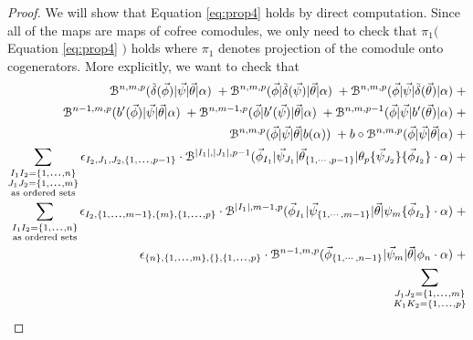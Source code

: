 \begin{proof}
We will show that Equation \ref{eq:prop4} 
holds by direct computation. Since all of 
the maps are maps of cofree comodules, we 
only need to check that $\pi_1($
Equation \ref{eq:prop4} $)$ holds where 
$\pi_1$ denotes projection of the comodule 
onto cogenerators. More explicitly, we 
want to check that
\begin{equation} \label{eq:prop4_expand}
\begin{aligned}
\mathcal{B}^{n,m,p} ( \tilde{\delta}(\vec{\phi}) | \vec{\psi} | \vec{\theta} | \alpha ) \; + 
\mathcal{B}^{n,m,p} ( \vec{\phi} | \tilde{\delta}(\vec{\psi}) | \vec{\theta} | \alpha ) \; + 
\mathcal{B}^{n,m,p} ( \vec{\phi} | \vec{\psi} | \tilde{\delta}(\vec{\theta}) | \alpha ) \; + \\
\mathcal{B}^{n-1,m,p} ( b^\prime(\vec{\phi}) | \vec{\psi} | \vec{\theta} | \alpha ) \; + 
\mathcal{B}^{n,m-1,p} ( \vec{\phi} | b^\prime(\vec{\psi}) | \vec{\theta} | \alpha ) \; + 
\mathcal{B}^{n,m,p-1} ( \vec{\phi} | \vec{\psi} | b^\prime(\vec{\theta}) | \alpha ) \; + \\
\mathcal{B}^{n,m,p} ( \vec{\phi} | \vec{\psi} | \vec{\theta} | b(\alpha) ) \; + 
b \circ \mathcal{B}^{n,m,p} ( \vec{\phi} | \vec{\psi} | \vec{\theta} | \alpha ) \; + \\
\sum \limits_{\substack{
  I_1I_2 = \{1,\smdots,n\}\\
  J_1J_2 = \{1,\smdots,m\}\\
  \textrm{as ordered sets}}}
  \epsilon_{I_2, J_1,J_2,\{1,\smdots,p-1\}} \cdot
 \mathcal{B}^{|I_1|,|J_1|,p-1}(\vec{\phi}_{I_1} | \vec{\psi}_{J_1} | \vec{\theta}_{\{1,\cdots, p-1\}} |
     \theta_{p} \{\vec{\psi}_{J_2}\} \{\vec{\phi}_{I_2}\} \cdot \alpha ) \; + \\
%
\sum \limits_{\substack{
  I_1I_2 = \{1,\smdots,n\}\\
  \textrm{as ordered sets}}}
  \epsilon_{I_2,\{1,\smdots,m-1\},\{m\},\{1,\smdots,p\}} \cdot   
 \mathcal{B}^{|I_1|,m-1,p}(\vec{\phi}_{I_1} | \vec{\psi}_{\{1,\cdots, m-1\}} | \vec{\theta} |
     \psi_{m} \{\vec{\phi}_{I_2}\}\cdot \alpha ) \; + \\
%     
\epsilon_{\{n\},\{1,\smdots,m\},\{\},\{1,\smdots,p\}}\cdot
\mathcal{B}^{n-1,m,p}(\vec{\phi}_{\{1,\cdots, n-1\}} |\vec{\psi}_{m} | \vec{\theta} | 
     \phi_{n} \cdot \alpha) \; + \\
\sum \limits_{\substack{
  J_1J_2 = \{1,\smdots,m\}\\
  K_1K_2 = \{1,\smdots,p\}\\
}}
\end{aligned}
\end{equation}
\end{proof}
